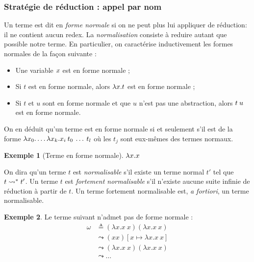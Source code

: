 \documentclass {article}
\theoremstyle{definition}
\newtheorem{example}{Exemple}
\theoremstyle{remark}
\begin{document}
\subsubsection{Stratégie de réduction : appel par nom}

\label{reduction:call_by_name}
Un terme est dit en \emph{forme
  normale} si on ne peut plus lui
appliquer de réduction: il ne contient aucun redex. La \emph{normalisation}
consiste à reduire autant que possible notre terme. En
particulier, on caractérise inductivement les formes normales de la
façon suivante :
%
\begin{itemize}
\item Une variable \(x\) est en forme normale ;
\item Si \(t\) est en forme normale, alors \(\lambda x. t\) est en
  forme normale ;
\item Si \(t\) et \(u\) sont en forme normale et que \(u\) n'est pas
  une abstraction, alors \(t\:u\) est en forme normale.
\end{itemize}

On en déduit qu'un terme est en forme normale si et seulement s'il est
de la forme
\(\lambda x_0. \ldots\lambda x_k. x_i\:t_0\:\ldots\:t_l\)
où les \(t_j\) sont eux-mêmes des termes normaux.

\begin{example}[Terme en forme normale]
  \(\lambda x. x\)
\end{example}

On dira qu'un terme \(t\) est \emph{normalisable} s'il existe un terme
normal \(t'\) tel que \(t \leadsto^{*} t'\). Un terme \(t\) est
\emph{fortement normalisable} s'il n'existe aucune suite infinie de
réduction à partir de \(t\). Un terme fortement normalisable est,
\textit{a fortiori}, un terme normalisable.

\begin{example}
 \label{paradoxe}
  Le terme suivant n'admet pas de forme normale :
  \begin{align*}
    \omega &\triangleq (\lambda x. x\: x) (\lambda x. x\: x) \\
           &\leadsto (x x)[x \mapsto \lambda x. x\: x] \\
           &\leadsto (\lambda x. x\: x) (\lambda x. x\: x) \\
           &\leadsto \ldots \\
  \end{align*}
\end{example}
\end{document}
